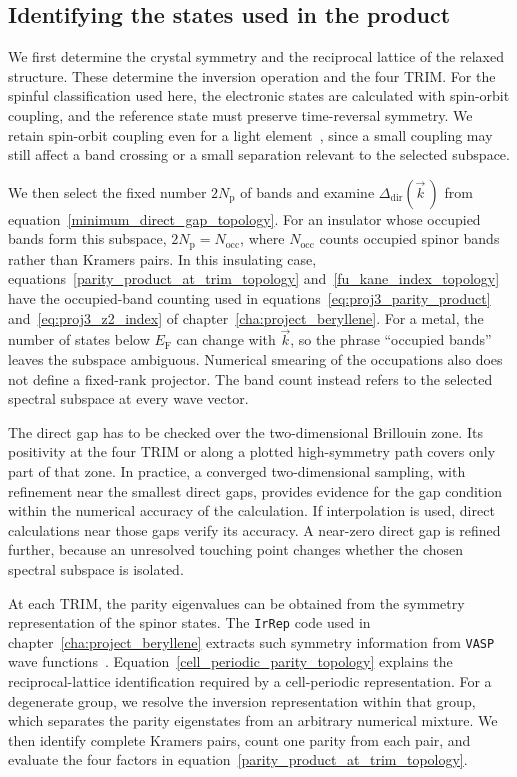\FloatBarrier
\subsection{Identifying the states used in the product}

We first determine the crystal symmetry and the reciprocal lattice of the relaxed structure.
These determine the inversion operation and the four TRIM.
For the spinful classification used here, the electronic states are calculated with spin-orbit coupling,
and the reference state must preserve time-reversal symmetry.
We retain spin-orbit coupling even for a light element~\cite{molle2017buckled},
since a small coupling may still affect a band crossing or a small separation relevant to the selected subspace.

We then select the fixed number $2N_\mathrm{p}$ of bands and examine
$\Delta_\mathrm{dir}(\vec{k}\,)$ from equation~\eqref{minimum_direct_gap_topology}.
For an insulator whose occupied bands form this subspace, $2N_\mathrm{p}=N_\mathrm{occ}$,
where $N_\mathrm{occ}$ counts occupied spinor bands rather than Kramers pairs.
In this insulating case, equations~\eqref{parity_product_at_trim_topology} and~\eqref{fu_kane_index_topology}
have the occupied-band counting used in equations~\eqref{eq:proj3_parity_product} and~\eqref{eq:proj3_z2_index} of chapter~\ref{cha:project_beryllene}.
For a metal, the number of states below $E_\mathrm{F}$ can change with $\vec{k}$,
so the phrase ``occupied bands'' leaves the subspace ambiguous.
Numerical smearing of the occupations also does not define a fixed-rank projector.
The band count instead refers to the selected spectral subspace at every wave vector.

The direct gap has to be checked over the two-dimensional Brillouin zone.
Its positivity at the four TRIM or along a plotted high-symmetry path covers only part of that zone.
In practice, a converged two-dimensional sampling, with refinement near the smallest direct gaps,
provides evidence for the gap condition within the numerical accuracy of the calculation.
If interpolation is used, direct calculations near those gaps verify its accuracy.
A near-zero direct gap is refined further, because an unresolved touching point changes whether the chosen spectral subspace is isolated.

At each TRIM, the parity eigenvalues can be obtained from the symmetry representation of the spinor states.
The \texttt{IrRep} code used in chapter~\ref{cha:project_beryllene}
extracts such symmetry information from \texttt{VASP} wave functions~\cite{iraola2022irrep}.
Equation~\eqref{cell_periodic_parity_topology} explains the reciprocal-lattice identification required by a cell-periodic representation.
For a degenerate group, we resolve the inversion representation within that group,
which separates the parity eigenstates from an arbitrary numerical mixture.
We then identify complete Kramers pairs, count one parity from each pair,
and evaluate the four factors in equation~\eqref{parity_product_at_trim_topology}.

